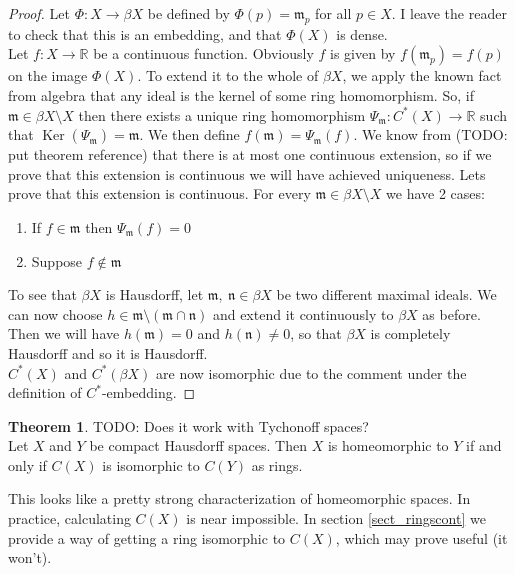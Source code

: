 \documentclass[a4paper]{book}
\theoremstyle{definition}
\newtheorem{theorem}{Theorem}[section]
\theoremstyle{ejemplo}
\theoremstyle{demostracion}
\newcommand{\reales}{\mathbb{R}}
\DeclareMathOperator{\kernel}{Ker}
\begin{document}
\begin{proof}
	Let $\Phi: X \rightarrow \beta X$ be defined by $\Phi(p) = \mathfrak{m}_p$ for all $p \in X$. I leave the reader to check that this is an embedding, and that $\Phi(X)$ is dense.\\ 
	Let $f: X \rightarrow \reales$ be a continuous function. Obviously $f$ is given by $f(\mathfrak{m}_p) = f(p)$ on the image $\Phi(X)$. To extend it to the whole of $\beta X$, we apply the known fact from algebra that any ideal is the kernel of some ring homomorphism. So, if $\mathfrak{m} \in \beta X \setminus X$ then there exists a unique ring homomorphism $\Psi_{\mathfrak{m}} : C^*(X) \rightarrow \reales$ such that $\kernel(\Psi_{\mathfrak{m}}) = \mathfrak{m}$. We then define $f(\mathfrak{m}) = \Psi_{\mathfrak{m}}(f)$. We know from (TODO: put theorem reference) that there is at most one continuous extension, so if we prove that this extension is continuous we will have achieved uniqueness. Lets prove that this extension is continuous. For every $\mathfrak{m} \in \beta X \setminus X$ we have 2 cases:
	\begin{enumerate}
		\item
		If $f \in \mathfrak{m}$ then $\Psi_{\mathfrak{m}}(f) = 0$
		\item
		Suppose $f \not \in \mathfrak{m}$
	\end{enumerate}
	To see that $\beta X$ is Hausdorff, let $\mathfrak{m},\ \mathfrak{n} \in \beta X$ be two different maximal ideals. We can now choose $h \in \mathfrak{m} \setminus (\mathfrak{m} \cap \mathfrak{n})$ and extend it continuously to $\beta X$ as before. Then we will have $h(\mathfrak{m}) = 0$ and $h(\mathfrak{n}) \neq 0$, so that $\beta X$ is completely Hausdorff and so it is Hausdorff.\\ 
	$C^*(X)$ and $C^*(\beta X)$ are now isomorphic due to the comment under the definition of $C^*$-embedding.
\end{proof}

\begin{theorem}
	TODO: Does it work with Tychonoff spaces?\\ 
	Let $X$ and $Y$ be compact Hausdorff spaces. Then $X$ is homeomorphic to $Y$ if and only if $C(X)$ is isomorphic to $C(Y)$ as rings.
\end{theorem}
This looks like a pretty strong characterization of homeomorphic spaces. In practice, calculating $C(X)$ is near impossible. In section \eqref{sect_ringscont} we provide a way of getting a ring isomorphic to $C(X)$, which may prove useful (it won't).
\end{document}
